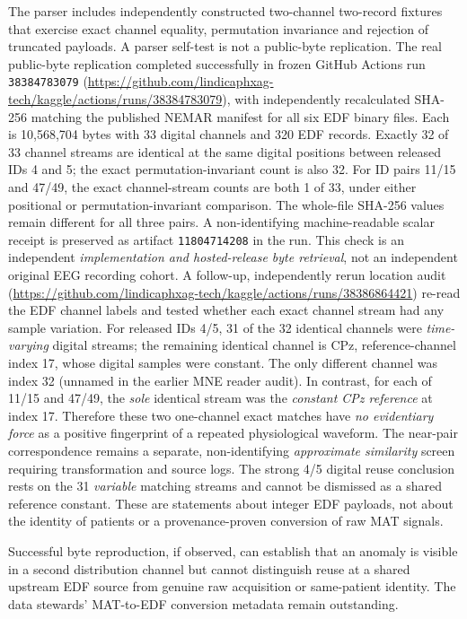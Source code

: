 The parser includes independently constructed two-channel
two-record fixtures that exercise exact channel equality,
permutation invariance and rejection of truncated payloads.
A parser self-test is not a public-byte replication.
The real public-byte replication completed successfully
in frozen GitHub Actions run \texttt{38384783079}
(\url{https://github.com/lindicaphxag-tech/kaggle/actions/runs/38384783079}),
with independently recalculated SHA-256 matching the
published NEMAR manifest for all six EDF binary files.
Each is 10,568,704 bytes with 33 digital channels
and 320 EDF records. Exactly 32 of 33 channel streams
are identical at the same digital positions between
released IDs 4 and 5; the exact permutation-invariant
count is also 32. For ID pairs 11/15 and 47/49,
the exact channel-stream counts are both 1 of 33,
under either positional or permutation-invariant
comparison. The whole-file SHA-256 values remain
different for all three pairs. A non-identifying
machine-readable scalar receipt is preserved
as artifact \texttt{11804714208} in the run.
This check is an independent \emph{implementation
and hosted-release byte retrieval}, not an
independent original EEG recording cohort.
A follow-up, independently rerun location audit
(\url{https://github.com/lindicaphxag-tech/kaggle/actions/runs/38386864421})
re-read the EDF channel labels and tested whether
each exact channel stream had any sample variation.
For released IDs 4/5, 31 of the 32 identical channels
were \emph{time-varying} digital streams; the
remaining identical channel is CPz, reference-channel
index 17, whose digital samples were constant.
The only different channel was index 32
(unnamed in the earlier MNE reader audit).
In contrast, for each of 11/15 and 47/49,
the \emph{sole} identical stream was the
\emph{constant CPz reference} at index 17.
Therefore these two one-channel exact matches
have \emph{no evidentiary force} as a positive
fingerprint of a repeated physiological waveform.
The near-pair correspondence remains a separate,
non-identifying \emph{approximate similarity}
screen requiring transformation and source logs.
The strong 4/5 digital reuse conclusion rests
on the 31 \emph{variable} matching streams
and cannot be dismissed as a shared reference
constant. These are statements about integer EDF
payloads, not about the identity of patients or
a provenance-proven conversion of raw MAT signals.

Successful byte reproduction, if observed, can establish
that an anomaly is visible in a second distribution channel
but cannot distinguish reuse at a shared upstream EDF
source from genuine raw acquisition or same-patient
identity. The data stewards' MAT-to-EDF conversion
metadata remain outstanding.
